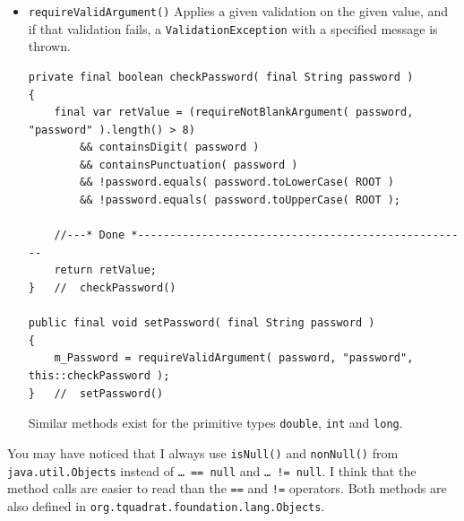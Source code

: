 \begin{itemize}
\item{\lstinline|requireValidArgument()|\autocite{TQUADRAT_ORG_FOUNDATION_OBJECTS:requireValidArgument} Applies a given validation on the given value, and if that validation fails, a \lstinline|ValidationException| with a specified message is thrown.
\begin{lstlisting}
private final boolean checkPassword( final String password )
{
    final var retValue = (requireNotBlankArgument( password, "password" ).length() > 8)
        && containsDigit( password )
        && containsPunctuation( password )
        && !password.equals( password.toLowerCase( ROOT )
        && !password.equals( password.toUpperCase( ROOT );
        	 
    //---* Done *----------------------------------------------------
    return retValue;
}   //  checkPassword()

public final void setPassword( final String password )
{
    m_Password = requireValidArgument( password, "password", this::checkPassword );
}   //  setPassword()
\end{lstlisting}

Similar methods exist for the primitive types \lstinline|double|, \lstinline|int| and \lstinline|long|.}
\end{itemize}

You may have noticed that I always use \lstinline|isNull()|\autocite{ORACLE_DOC_OBJECTS:isNull} and \lstinline|nonNull()|\autocite{ORACLE_DOC_OBJECTS:nonNull} from \lstinline|java.util.Objects| instead of \lstinline|… == null| and \lstinline|… != null|. I think that the method calls are easier to read than the \verb#==# and \verb#!=# operators. Both methods are also defined in \lstinline|org.tquadrat.foundation.lang.Objects|\autocite{TQUADRAT_ORG_FOUNDATION_OBJECTS}.

